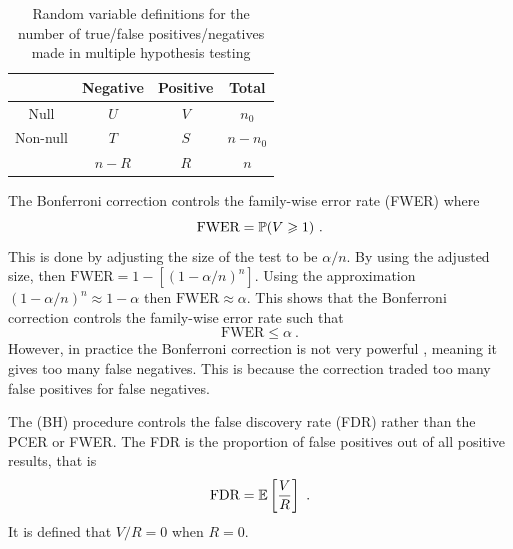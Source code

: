 \begin{table}
  \centering
  \begin{tabular}{c|c|c|c}
    &Negative&Positive&Total\\\hline
    Null & $U$ & $V$ & $n_0$\\
    Non-null & $T$ & $S$ & $n-n_0$\\\hline
    &$n-R$&$R$&$n$
  \end{tabular}
  \caption{Random variable definitions for the number of true/false positives/negatives made in multiple hypothesis testing}
  \label{table:inference_randomvariables}
\end{table} 

The Bonferroni correction \citep{shaffer1995multiple, bland1995multiple, perneger1998what} controls the family-wise error rate (FWER) \citep{shaffer1995multiple} where
\begin{equation}
  \text{FWER} = \operatorname{\mathbb{P}}(V\geqslant1) \ .
  \label{eq:inference_fwer}
\end{equation}
This is done by adjusting the size of the test to be $\alpha/n$. By using the adjusted size, then $\text{FWER}=1-\left[(1-\alpha/n)^n\right]$. Using the approximation $(1-\alpha/n)^n\approx 1-\alpha$ then $\text{FWER}\approx \alpha$. This shows that the Bonferroni correction controls the family-wise error rate such that
\begin{equation}
  \text{FWER} \leqslant \alpha \ .
\end{equation}
However, in practice the Bonferroni correction is not very powerful \citep{perneger1998what}, meaning it gives too many false negatives. This is because the correction traded too many false positives for false negatives.

The \cite{benjamini1995controlling} (BH) procedure controls the false discovery rate (FDR) \citep{benjamini2010discovering} rather than the PCER or FWER. The FDR is the proportion of false positives out of all positive results, that is
\begin{equation}
  \text{FDR} = \operatorname{\mathbb{E}}\left[\dfrac{V}{R}\right]
  \ .
\end{equation}
It is defined that $V/R=0$ when $R=0$.

